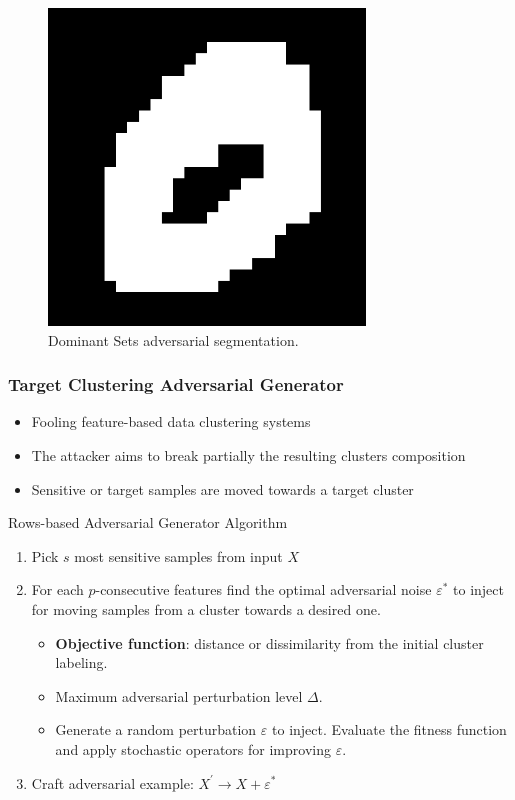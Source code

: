 \documentclass{beamer}
\begin{document}
\begin{frame}
\begin{figure}[H]
\begin{minipage}[t]{0.3\linewidth}
			\centering
			\includegraphics[width=0.75\textwidth]{img/advpixel/advpredicted.png}
			\caption{\small Dominant Sets adversarial segmentation.}
		\end{minipage}
	\end{figure}
\end{frame}


\begin{frame}
	\frametitle{Target Clustering Adversarial Generator}
	\begin{itemize}
		\item Fooling feature-based data clustering systems
		\item The attacker aims to break partially the resulting clusters composition
		\item Sensitive or target samples are moved towards a target cluster
	\end{itemize}
	\begin{block}{Rows-based Adversarial Generator Algorithm}
		
		\begin{enumerate}
			\item Pick $s$ most sensitive samples from input $X$
			\item For each $p$-consecutive features find the optimal adversarial noise $\varepsilon^*$ to inject for moving samples from a cluster towards a desired one.
			\begin{itemize}
				\item \textbf{Objective function}: distance or dissimilarity from the initial cluster labeling. 
				
				\item Maximum adversarial perturbation level $\Delta$.
				
				\item Generate a random perturbation $\varepsilon$ to inject. Evaluate the fitness function and apply stochastic operators for improving $\varepsilon$.
			\end{itemize}
			\item Craft adversarial example: $X^\prime\rightarrow X +  \varepsilon^*$
		\end{enumerate}
	\end{block}
\end{frame}
\end{document}
